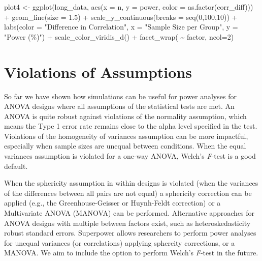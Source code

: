 \documentclass[
]{book}
\newenvironment{Shaded}{\begin{snugshade}}{\end{snugshade}}
\newcommand{\AttributeTok}[1]{\textcolor[rgb]{0.77,0.63,0.00}{#1}}
\newcommand{\DecValTok}[1]{\textcolor[rgb]{0.00,0.00,0.81}{#1}}
\newcommand{\FloatTok}[1]{\textcolor[rgb]{0.00,0.00,0.81}{#1}}
\newcommand{\FunctionTok}[1]{\textcolor[rgb]{0.00,0.00,0.00}{#1}}
\newcommand{\NormalTok}[1]{#1}
\newcommand{\OtherTok}[1]{\textcolor[rgb]{0.56,0.35,0.01}{#1}}
\newcommand{\SpecialCharTok}[1]{\textcolor[rgb]{0.00,0.00,0.00}{#1}}
\newcommand{\StringTok}[1]{\textcolor[rgb]{0.31,0.60,0.02}{#1}}
\begin{document}
\begin{Shaded}
\begin{Highlighting}[]
\NormalTok{plot4 }\OtherTok{\textless{}{-}} \FunctionTok{ggplot}\NormalTok{(long\_data, }\FunctionTok{aes}\NormalTok{(}\AttributeTok{x =}\NormalTok{ n, }\AttributeTok{y =}\NormalTok{ power,}
                               \AttributeTok{color =} \FunctionTok{as.factor}\NormalTok{(corr\_diff))) }\SpecialCharTok{+}
  \FunctionTok{geom\_line}\NormalTok{(}\AttributeTok{size =} \FloatTok{1.5}\NormalTok{) }\SpecialCharTok{+}
  \FunctionTok{scale\_y\_continuous}\NormalTok{(}\AttributeTok{breaks =} \FunctionTok{seq}\NormalTok{(}\DecValTok{0}\NormalTok{,}\DecValTok{100}\NormalTok{,}\DecValTok{10}\NormalTok{)) }\SpecialCharTok{+}
  \FunctionTok{labs}\NormalTok{(}\AttributeTok{color =} \StringTok{"Difference in Correlation"}\NormalTok{,}
       \AttributeTok{x =} \StringTok{"Sample Size per Group"}\NormalTok{,}
       \AttributeTok{y =} \StringTok{"Power (\%)"}\NormalTok{) }\SpecialCharTok{+}
  \FunctionTok{scale\_color\_viridis\_d}\NormalTok{() }\SpecialCharTok{+} \FunctionTok{facet\_wrap}\NormalTok{( }\SpecialCharTok{\textasciitilde{}}\NormalTok{ factor, }\AttributeTok{ncol=}\DecValTok{2}\NormalTok{)}
\end{Highlighting}
\end{Shaded}

\hypertarget{violations-of-assumptions}{%
\chapter{Violations of Assumptions}\label{violations-of-assumptions}}

So far we have shown how simulations can be useful for power analyses for ANOVA designs where all assumptions of the statistical tests are met.
An ANOVA is quite robust against violations of the normality assumption, which means the Type 1 error rate remains close to the alpha level specified in the test. Violations of the homogeneity of variances assumption can be more impactful, especially when sample sizes are unequal between conditions.
When the equal variances assumption is violated for a one-way ANOVA, Welch's \emph{F}-test is a good default.

When the sphericity assumption in within designs is violated (when the variances of the differences between all pairs are not equal) a sphericity correction can be applied (e.g., the Greenhouse-Geisser or Huynh-Feldt correction) or a Multivariate ANOVA (MANOVA) can be performed.
Alternative approaches for ANOVA designs with multiple between factors exist, such as heteroskedasticity robust standard errors.
Superpower allows researchers to perform power analyses for unequal variances (or correlations) applying sphercity corrections, or a MANOVA. We aim to include the option to perform Welch's \emph{F}-test in the future.
\end{document}
